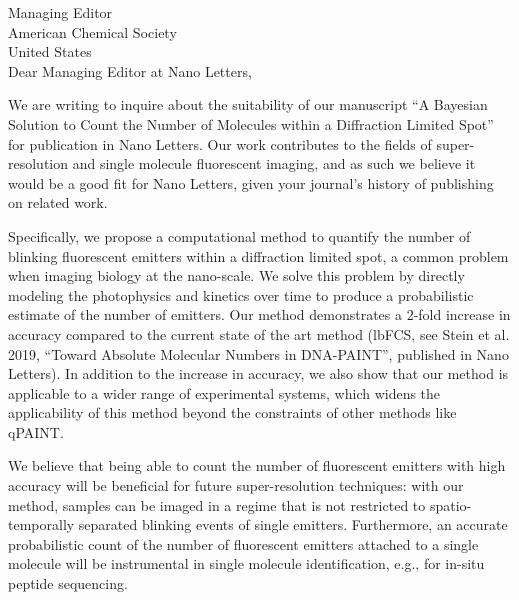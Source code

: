 \documentclass{article}
\date{\today}
\begin{document}
\thispagestyle{empty}
Managing Editor\\
American Chemical Society\\
United States\\

\vspace{5mm}
Dear Managing Editor at Nano Letters,


We are writing to inquire about the suitability of our manuscript
``A Bayesian Solution to Count the Number of Molecules within a Diffraction Limited Spot''
for publication in Nano Letters. 
%
%
Our work contributes to the fields of super-resolution and single molecule
fluorescent imaging, and as such we believe it would be a good fit for Nano
Letters, given your journal's history of publishing on related work.
%

Specifically, we propose a computational method to quantify the number of
blinking fluorescent emitters within a diffraction limited spot, a common
problem when imaging biology at the nano-scale.
%
We solve this problem by directly modeling the photophysics and kinetics over
time to produce a probabilistic estimate of the number of emitters.
%
Our method demonstrates a 2-fold increase in accuracy compared to the current
state of the art method (lbFCS, see Stein et al. 2019, ``Toward Absolute
Molecular Numbers in DNA-PAINT'', published in Nano Letters). In addition to
the increase in accuracy, we also show that our method is applicable to a wider
range of experimental systems, which widens the applicability of this method
beyond the constraints of other methods like qPAINT.

We believe that being able to count the number of fluorescent emitters with
high accuracy will be beneficial for future super-resolution techniques: with
our method, samples can be imaged in a regime that is not restricted to
spatio-temporally separated blinking events of single emitters. Furthermore, an
accurate probabilistic count of the number of fluorescent emitters attached to
a single molecule will be instrumental in single molecule identification, e.g.,
for in-situ peptide sequencing.
\end{document}

